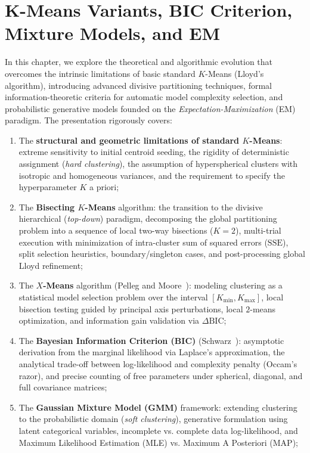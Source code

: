 \chapter{K-Means Variants, BIC Criterion, Mixture Models, and EM}
\label{chap:dm-kmeans-variants-bic-em}

In this chapter, we explore the theoretical and algorithmic evolution that overcomes the intrinsic limitations of basic standard $K$-Means (Lloyd's algorithm), introducing advanced divisive partitioning techniques, formal information-theoretic criteria for automatic model complexity selection, and probabilistic generative models founded on the \textit{Expectation-Maximization} (EM) paradigm.
The presentation rigorously covers:
\begin{enumerate}[noitemsep]
    \item The \textbf{structural and geometric limitations of standard $K$-Means}: extreme sensitivity to initial centroid seeding, the rigidity of deterministic assignment (\textit{hard clustering}), the assumption of hyperspherical clusters with isotropic and homogeneous variances, and the requirement to specify the hyperparameter $K$ a priori;
    \item The \textbf{Bisecting $K$-Means} algorithm: the transition to the divisive hierarchical (\textit{top-down}) paradigm, decomposing the global partitioning problem into a sequence of local two-way bisections ($K=2$), multi-trial execution with minimization of intra-cluster sum of squared errors ($\mathrm{SSE}$), split selection heuristics, boundary/singleton cases, and post-processing global Lloyd refinement;
    \item The \textbf{$X$-Means} algorithm (Pelleg and Moore~\cite{pelleg2000}): modeling clustering as a statistical model selection problem over the interval $[K_{\min}, K_{\max}]$, local bisection testing guided by principal axis perturbations, local $2$-means optimization, and information gain validation via $\Delta\mathrm{BIC}$;
    \item The \textbf{Bayesian Information Criterion (BIC)} (Schwarz~\cite{schwarz1978}): asymptotic derivation from the marginal likelihood via Laplace's approximation, the analytical trade-off between log-likelihood and complexity penalty (Occam's razor), and precise counting of free parameters under spherical, diagonal, and full covariance matrices;
    \item The \textbf{Gaussian Mixture Model (GMM)} framework: extending clustering to the probabilistic domain (\textit{soft clustering}), generative formulation using latent categorical variables, incomplete vs. complete data log-likelihood, and Maximum Likelihood Estimation (MLE) vs. Maximum A Posteriori (MAP);

\end{enumerate}
